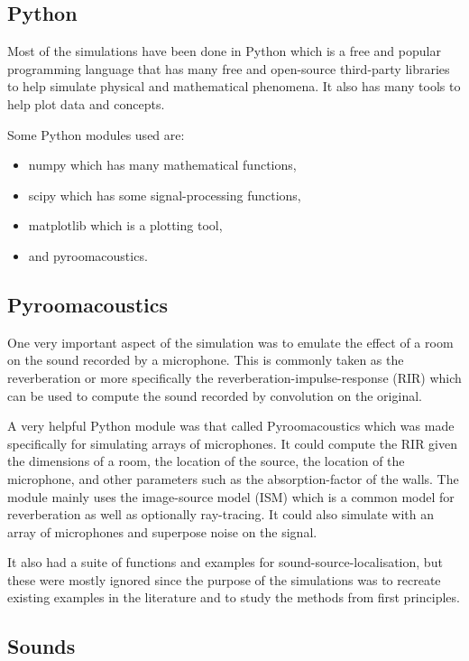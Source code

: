 \documentclass[notitlepage]{report}
\begin{document}
\subsection{Python}

Most of the simulations have been done in Python which is a free and popular programming language that has many free and open-source third-party libraries to help simulate physical and mathematical phenomena. It also has many tools to help plot data and concepts.

Some Python modules used are:
\begin{itemize}
	\item numpy which has many mathematical functions,
	\item scipy which has some signal-processing functions,
	\item matplotlib which is a plotting tool,
	\item and pyroomacoustics.
\end{itemize}

\subsection{Pyroomacoustics}

One very important aspect of the simulation was to emulate the effect of a room on the sound recorded by a microphone. This is commonly taken as the reverberation or more specifically the reverberation-impulse-response (RIR) which can be used to compute the sound recorded by convolution on the original.

A very helpful Python module was that called Pyroomacoustics which was made specifically for simulating arrays of microphones. It could compute the RIR given the dimensions of a room, the location of the source, the location of the microphone, and other parameters such as the absorption-factor of the walls. The module mainly uses the image-source model (ISM) which is a common model for reverberation as well as optionally ray-tracing. It could also simulate with an array of microphones and superpose noise on the signal.

It also had a suite of functions and examples for sound-source-localisation, but these were mostly ignored since the purpose of the simulations was to recreate existing examples in the literature and to study the methods from first principles.

\subsection{Sounds}
\end{document}
